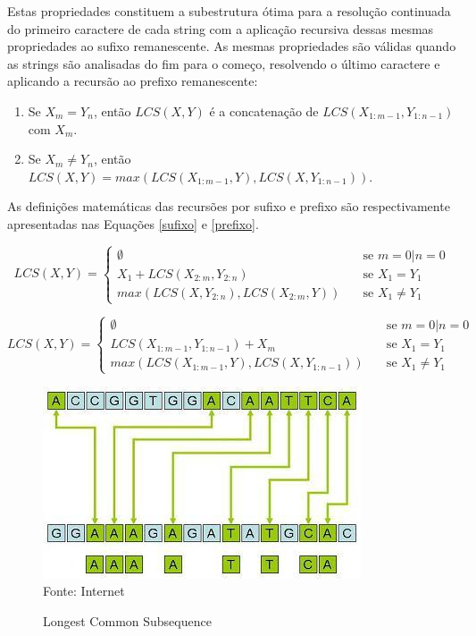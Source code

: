 \begin{itemize}
    Estas propriedades constituem a subestrutura ótima para a resolução continuada do primeiro caractere de cada string com a aplicação recursiva dessas mesmas propriedades ao sufixo remanescente. As mesmas propriedades são válidas quando as strings são analisadas do fim para o começo, resolvendo o último caractere e aplicando a recursão ao prefixo remanescente:
    
    \begin{enumerate}
        \item Se \({X_{m}=Y_{n}}\), então \({LCS(X,Y)}\) é a concatenação de \({LCS(X_{1:m-1},Y_{1:n-1})}\) com \({X_{m}}\).
        \item Se \({X_{m} \not= Y_{n}}\), então \({LCS(X,Y)=max(LCS(X_{1:m-1},Y), LCS(X,Y_{1:n-1}))}\).
    \end{enumerate}
    
    As definições matemáticas das recursões por sufixo e prefixo são respectivamente apresentadas nas Equações \ref{sufixo} e \ref{prefixo}.
    
    \begin{equation} \label{sufixo}
        LCS(X,Y) =
            \begin{cases}
            \emptyset & \quad \textrm{se } m=0 | n=0\\
            X_{1}+LCS(X_{2:m},Y_{2:n})  & \quad \textrm{se } X_{1}=Y_{1}\\
            max(LCS(X,Y_{2:n}),LCS(X_{2:m},Y)) & \quad \textrm{se } X_{1}\not=Y_{1}
            \end{cases}
    \end{equation}
    
    \begin{equation} \label{prefixo}
        LCS(X,Y) =
            \begin{cases}
            \emptyset & \quad \textrm{se } m=0 | n=0\\
            LCS(X_{1:m-1},Y_{1:n-1})+X_{m}  & \quad \textrm{se } X_{1}=Y_{1}\\
            max(LCS(X_{1:m-1},Y),LCS(X,Y_{1:n-1})) & \quad \textrm{se } X_{1}\not=Y_{1}
            \end{cases}
    \end{equation}
    
    \begin{figure}[!htb]
       \centering
       \caption{Longest Common Subsequence}\label{fig:lcs} 
       \includegraphics[scale=1.0]{figuras/lcs.jpg}
       \\Fonte: Internet
    \end{figure}
    

\end{itemize}
